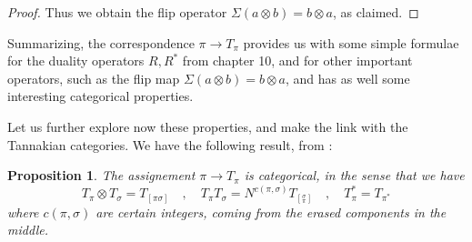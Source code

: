 \documentclass[12pt]{amsbook}
\newtheorem{proposition}[theorem]{Proposition}
\begin{document}
\begin{proof}
Thus we obtain the flip operator $\Sigma(a\otimes b)=b\otimes a$, as claimed.
\end{proof}

Summarizing, the correspondence $\pi\to T_\pi$ provides us with some simple formulae for the duality operators $R,R^*$ from chapter 10, and for other important operators, such as the flip map $\Sigma(a\otimes b)=b\otimes a$, and has as well some interesting categorical properties. 

\bigskip

Let us further explore now these properties, and make the link with the Tannakian categories. We have the following result, from \cite{bsp}:

\begin{proposition}
The assignement $\pi\to T_\pi$ is categorical, in the sense that we have
$$T_\pi\otimes T_\sigma=T_{[\pi\sigma]}\quad,\quad 
T_\pi T_\sigma=N^{c(\pi,\sigma)}T_{[^\sigma_\pi]}\quad,\quad 
T_\pi^*=T_{\pi^*}$$
where $c(\pi,\sigma)$ are certain integers, coming from the erased components in the middle.
\end{proposition}
\end{document}
